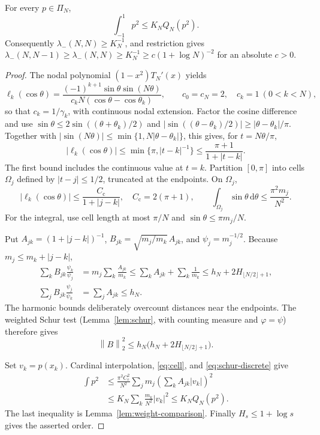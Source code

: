 \documentclass{siamart251216}
\newcommand{\Pn}{\Pi}
\newcommand{\norm}[1]{\left\lVert#1\right\rVert}
\newcommand{\dd}{\,\mathrm d}
\begin{document}
\begin{theorem}\label{thm:cardinal}%
For every $p\in\Pn_N$,
\begin{equation}\label{eq:cardinal-result}
 \int_{-1}^1p^2\le K_N Q_N(p^2).
\end{equation}
Consequently $\lambda_-(N,N)\ge K_N^{-1}$, and restriction gives
$\lambda_-(N,N-1)\ge\lambda_-(N,N)\ge K_N^{-1}
\ge c(1+\log N)^{-2}$ for an absolute $c>0$.
\end{theorem}
\begin{proof}
The nodal polynomial $(1-x^2)T_N'(x)$ yields
\[
 \ell_k(\cos\theta)=
 \frac{(-1)^{k+1}\sin\theta\sin(N\theta)}
      {c_kN(\cos\theta-\cos\theta_k)},\qquad
 c_0=c_N=2,\quad c_k=1\ (0<k<N),
\]
so that $c_k=1/\gamma_k$, with continuous nodal extension. Factor the cosine difference and use
$\sin\theta\le2\sin((\theta+\theta_k)/2)$ and
$|\sin((\theta-\theta_k)/2)|\ge|\theta-\theta_k|/\pi$.
Together with $|\sin(N\theta)|\le\min\{1,N|\theta-\theta_k|\}$,
this gives, for $t=N\theta/\pi$,
\begin{equation}\label{eq:cardinal-decay}
 |\ell_k(\cos\theta)|\le\min\{\pi,|t-k|^{-1}\}
       \le\frac{\pi+1}{1+|t-k|}.
\end{equation}
The first bound includes the continuous value at $t=k$.
Partition $[0,\pi]$ into cells $\Omega_j$ defined by $|t-j|\le1/2$,
truncated at the endpoints. On $\Omega_j$,
\begin{equation}\label{eq:cell}
 |\ell_k(\cos\theta)|\le\frac{C_{\mathrm c}}{1+|j-k|},\quad C_{\mathrm c}=2(\pi+1),
 \qquad \int_{\Omega_j}\sin\theta\dd\theta\le\frac{\pi^2m_j}{N^2}.
\end{equation}
For the integral, use cell length at most $\pi/N$ and
$\sin\theta\le\pi m_j/N$.

Put $A_{jk}=(1+|j-k|)^{-1}$, $B_{jk}=\sqrt{m_j/m_k}\,A_{jk}$,
and $\psi_j=m_j^{-1/2}$. Because $m_j\le m_k+|j-k|$,
\begin{align*}
 \sum_k B_{jk}\frac{\psi_k}{\psi_j}
 &=m_j\sum_k\frac{A_{jk}}{m_k}
 \le\sum_k A_{jk}+\sum_k\frac1{m_k}
 \le h_N+2H_{\lfloor N/2\rfloor+1},\\
 \sum_j B_{jk}\frac{\psi_j}{\psi_k}&=\sum_j A_{jk}\le h_N.
\end{align*}
The harmonic bounds deliberately overcount distances near the endpoints.
The weighted Schur test (Lemma~\ref{lem:schur}, with counting measure and
$\varphi=\psi$) therefore gives
\begin{equation}\label{eq:schur-discrete}
 \norm B_2^2\le h_N\bigl(h_N+2H_{\lfloor N/2\rfloor+1}\bigr).
\end{equation}

Set $v_k=p(x_k)$. Cardinal interpolation, \eqref{eq:cell}, and
\eqref{eq:schur-discrete} give
\begin{align*}
 \int p^2
 &\le\frac{\pi^2C_{\mathrm c}^2}{N^2}
       \sum_jm_j\left(\sum_kA_{jk}|v_k|\right)^2\\
 &\le K_N\sum_k\frac{m_k}{N^2}|v_k|^2
 \le K_NQ_N(p^2).
\end{align*}
The last inequality is Lemma~\ref{lem:weight-comparison}.
Finally $H_s\le1+\log s$ gives the asserted order.
\end{proof}
\end{document}
